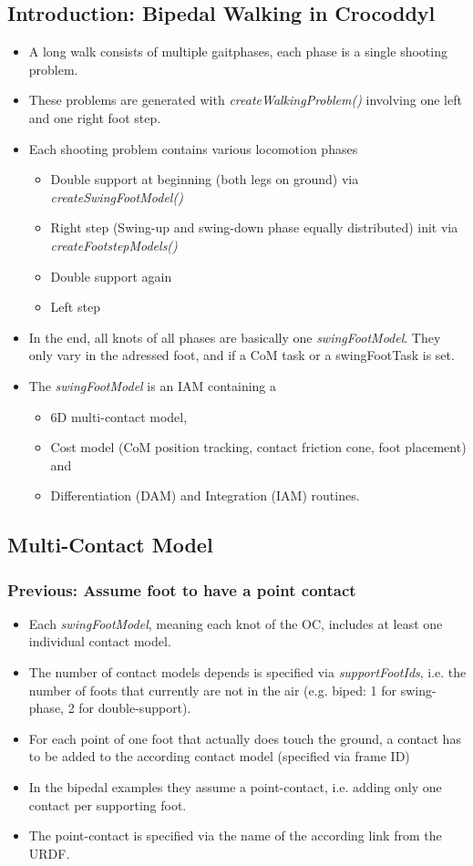 \subsection{Introduction: Bipedal Walking in Crocoddyl}
\begin{itemize}
\item A long walk consists of multiple gaitphases, each phase is a single shooting problem.
\item These problems are generated with \textit{createWalkingProblem()} involving one left and one right foot step.
\item Each shooting problem contains various locomotion phases
	\begin{itemize}
	\item Double support at beginning (both legs on ground) via \textit{createSwingFootModel()}
	\item Right step (Swing-up and swing-down phase equally distributed) init via    	\textit{createFootstepModels()}
	\item Double support again
	\item Left step
	\end{itemize}	
\item In the end, all knots of all phases are basically one \textit{swingFootModel}. They only vary in the adressed foot, and if a CoM task or a swingFootTask is set.
\item The \textit{swingFootModel} is an IAM containing a 
	\begin{itemize}
	\item 6D multi-contact model,
	\item Cost model (CoM position tracking, contact friction cone, foot placement) and
	\item Differentiation (DAM) and Integration (IAM) routines.
	\end{itemize}
\end{itemize}

\subsection{Multi-Contact Model}
\subsubsection{Previous: Assume foot to have a point contact}
\begin{itemize}
\item Each \textit{swingFootModel}, meaning each knot of the OC, includes at least one individual contact model.
\item The number of contact models depends is specified via \textit{supportFootIds}, i.e. the number of foots that currently are not in the air (e.g. biped: 1 for swing-phase, 2 for double-support).
\item For each point of one foot that actually does touch the ground, a contact has to be added to the according contact model (specified via frame ID)
\item In the bipedal examples they assume a point-contact, i.e. adding only one contact per supporting foot.
\item The point-contact is specified via the name of the according link from the URDF.
\end{itemize}
